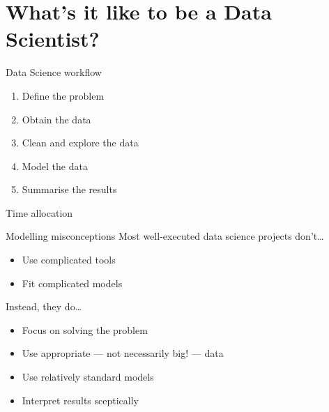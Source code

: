 \section[What's it like \\ to be a Data Scientist?]%
        {What's it like to be a Data Scientist?}

\begin{frame}{Data Science workflow}
    \begin{enumerate}
        \setlength{\itemsep}{0.75em}
        \item Define the problem
        \item Obtain the data
        \item Clean and explore the data
        \item Model the data
        \item Summarise the results
    \end{enumerate}
\end{frame}

\begin{frame}{Time allocation}
\end{frame}

\begin{frame}{Modelling misconceptions}
    Most well\hyp{}executed data science projects don't\ldots\vspace{-1ex}
    \begin{itemize}
        \item Use complicated tools
        \item Fit complicated models
    \end{itemize}
    \vfill
    Instead, they do\ldots\vspace{-1ex}
    \begin{itemize}
        \item \alert{Focus on solving the problem}
        \item Use appropriate --- not necessarily big! --- data
        \item Use relatively standard models
        \item Interpret results sceptically
    \end{itemize}
\end{frame}

